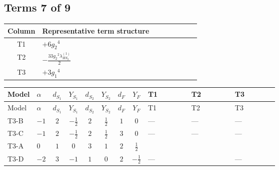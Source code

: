 \documentclass[8pt]{article}
\begin{document}
\begin{landscape}
\subsection*{Terms 7 of 9}
\begin{center}
\begin{tabular}{@{}c >{\raggedright\arraybackslash}p{0.82\linewidth}@{}}
\toprule
Column & Representative term structure \\
\midrule
T1 & \(\displaystyle +6 {g_2}^4\) \\
\midrule
T2 & \(\displaystyle -\frac{33 {g_2}^2 {\lambda_{HS_2}^{(1)}}}{2}\) \\
\midrule
T3 & \(\displaystyle +3 {g_1}^4\) \\
\midrule
\bottomrule
\end{tabular}
\end{center}
\smallskip
\tiny
\begin{longtable}{@{}llcccccc >{\raggedright\arraybackslash}p{0.21\linewidth} >{\raggedright\arraybackslash}p{0.21\linewidth} >{\raggedright\arraybackslash}p{0.21\linewidth}@{}}
\toprule
Model & $\alpha$ & $d_{S_1}$ & $Y_{S_1}$ & $d_{S_2}$ & $Y_{S_2}$ & $d_F$ & $Y_F$ & T1 & T2 & T3 \\
\midrule
\endfirsthead
\toprule
Model & $\alpha$ & $d_{S_1}$ & $Y_{S_1}$ & $d_{S_2}$ & $Y_{S_2}$ & $d_F$ & $Y_F$ & T1 & T2 & T3 \\
\midrule
\endhead
T3-B & $-1$ & $2$ & $-\frac{1}{2}$ & $2$ & $\frac{1}{2}$ & $1$ & $0$ & --- & --- & --- \\
\midrule
T3-C & $-1$ & $2$ & $-\frac{1}{2}$ & $2$ & $\frac{1}{2}$ & $3$ & $0$ & --- & --- & --- \\
\midrule
T3-A & $0$ & $1$ & $0$ & $3$ & $1$ & $2$ & $\frac{1}{2}$ & \scriptsize\adjustbox{max width=\linewidth}{$\begin{gathered} +6 {g_2}^4\end{gathered}$} & \scriptsize\adjustbox{max width=\linewidth}{$\begin{gathered} -\frac{33 {g_2}^2 {\lambda_{HS_2}^{(1)}}}{2}\end{gathered}$} & \scriptsize\adjustbox{max width=\linewidth}{$\begin{gathered} +3 {g_1}^4\end{gathered}$} \\
\midrule
T3-D & $-2$ & $3$ & $-1$ & $1$ & $0$ & $2$ & $-\frac{1}{2}$ & --- & \scriptsize\adjustbox{max width=\linewidth}{$\begin{gathered} -\frac{9 {g_2}^2 {\lambda_{HS_2}^{(1)}}}{2}\end{gathered}$} & --- \\

\end{longtable}
\end{landscape}
\end{document}
